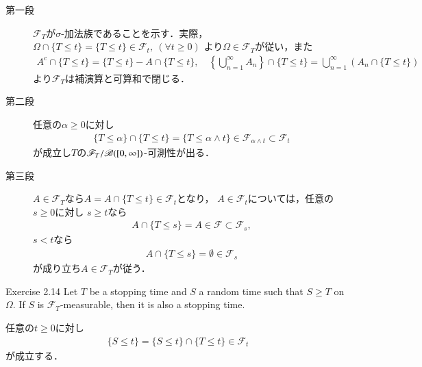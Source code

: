 	\begin{prf}\mbox{}
		\begin{description}
			\item[第一段]
				$\mathscr{F}_T$が$\sigma$-加法族であることを示す．実際，
				$\Omega \cap \{T \leq t\} = \{T \leq t\} \in \mathscr{F}_t,\ (\forall t \geq 0)$
				より$\Omega \in \mathscr{F}_T$が従い，また
				\begin{align}
					A^c \cap \{T \leq t\} = \{T \leq t\} - A \cap \{T \leq t\},
					\quad \left\{ \bigcup_{n=1}^\infty A_n \right\} \cap \{T \leq t\}
					= \bigcup_{n=1}^\infty \left( A_n \cap \{T \leq t\} \right)
				\end{align}
				より$\mathscr{F}_T$は補演算と可算和で閉じる．
				
			\item[第二段]
				任意の$\alpha \geq 0$に対し
				\begin{align}
					\{T \leq \alpha \} \cap \{T \leq t\}
					= \{T \leq \alpha \wedge t\}
					\in \mathscr{F}_{\alpha \wedge t} \subset \mathscr{F}_t
				\end{align}
				が成立し$T$の$\mathscr{F}_T/\mathscr{B}([0,\infty])$-可測性が出る．
				
			\item[第三段]
				$A \in \mathscr{F}_T$なら$A = A \cap \{T \leq t\} \in \mathscr{F}_t$となり，
				$A \in \mathscr{F}_t$については，任意の$s \geq 0$に対し
				$s \geq t$なら
				\begin{align}
					A \cap \{T \leq s\} = A \in \mathscr{F} \subset \mathscr{F}_s,
				\end{align}
				$s < t$なら
				\begin{align}
					A \cap \{T \leq s\} = \emptyset \in \mathscr{F}_s
				\end{align}
				が成り立ち$A \in \mathscr{F}_T$が従う．
				\QED
		\end{description}
	\end{prf}
	
	\begin{itembox}[l]{Exercise 2.14}
		Let $T$ be a stopping time and $S$ a random time such that $S \geq T$ 
		on $\Omega$. If $S$ is $\mathscr{F}_T$-measurable, then it is also a stopping time.
	\end{itembox}
	
	\begin{prf}
		任意の$t \geq 0$に対し
		\begin{align}
			\{S \leq t\} = \{S \leq t\} \cap \{T \leq t\} \in \mathscr{F}_t
		\end{align}
		が成立する．
		\QED
	\end{prf}
	

